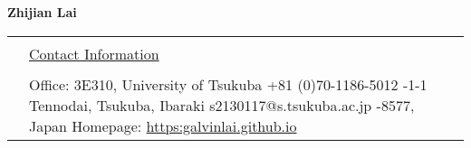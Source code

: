 \documentclass[letterpaper,11pt]{article}
\newcommand{\headingfont}{\LARGE \MakeUppercase }
\newenvironment{SectionTable}[1]{
	\renewcommand*{\arraystretch}{1.0}
	\setlength{\tabcolsep}{10pt}
	\begin{longtable}{Rp{5.2in}} 
		\rule{2.5cm}{4pt} 
		& \underline{#1} \\ %
	}
	{
	\end{longtable}\vspace{-.3cm}
}
\begin{document}
	

\thispagestyle{plain}  %


\begin{center}
	{\Huge \bf Zhijian Lai} 
\end{center}
\begin{SectionTable}{\headingfont Contact Information} 
	&
	Office: 3E310, University of Tsukuba \hfill +81 (0)70-1186-5012 -1-1 Tennodai, Tsukuba, Ibaraki \hfill s2130117@s.tsukuba.ac.jp -8577, Japan  \hfill 
	Homepage: \href{https://galvinlai.github.io}{https:galvinlai.github.io}	
\end{SectionTable}





\end{document}
